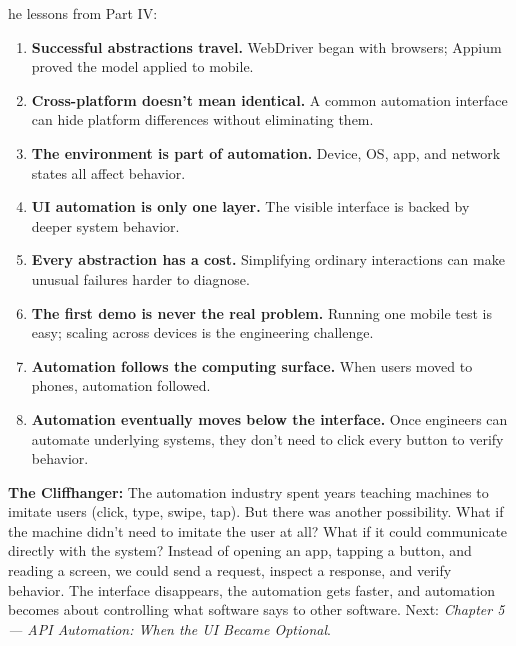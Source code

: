 \documentclass[11pt, a4paper, openany]{book}
\newcommand{\initialcap}[1]{{\fontfamily{lmss}\selectfont\huge\textbf{#1}}}
\begin{document}
\noindent \initialcap{T}he lessons from Part IV:
\begin{enumerate}
    \item \textbf{Successful abstractions travel.} WebDriver began with browsers; Appium proved the model applied to mobile.
    \item \textbf{Cross-platform doesn't mean identical.} A common automation interface can hide platform differences without eliminating them.
    \item \textbf{The environment is part of automation.} Device, OS, app, and network states all affect behavior.
    \item \textbf{UI automation is only one layer.} The visible interface is backed by deeper system behavior.
    \item \textbf{Every abstraction has a cost.} Simplifying ordinary interactions can make unusual failures harder to diagnose.
    \item \textbf{The first demo is never the real problem.} Running one mobile test is easy; scaling across devices is the engineering challenge.
    \item \textbf{Automation follows the computing surface.} When users moved to phones, automation followed.
    \item \textbf{Automation eventually moves below the interface.} Once engineers can automate underlying systems, they don't need to click every button to verify behavior.
\end{enumerate}

\noindent \textbf{The Cliffhanger:} The automation industry spent years teaching machines to imitate users (click, type, swipe, tap). But there was another possibility. What if the machine didn't need to imitate the user at all? What if it could communicate directly with the system? Instead of opening an app, tapping a button, and reading a screen, we could send a request, inspect a response, and verify behavior. The interface disappears, the automation gets faster, and automation becomes about controlling what software says to other software. Next: \textit{Chapter 5 --- API Automation: When the UI Became Optional}.
\end{document}
